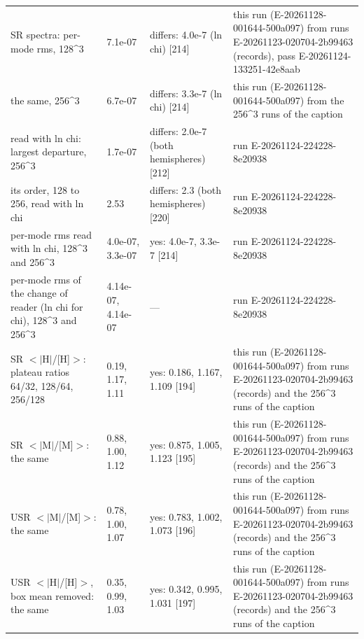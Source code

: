 \begin{table}
\begin{tabular}{p{}p{}p{}p{}}
SR spectra: per-mode rms, 128\^{}3 & 7.1e-07 & differs: 4.0e-7 (ln chi) [214] & this run (E-20261128-001644-500a097) from runs E-20261123-020704-2b99463 (records), pass E-20261124-133251-42e8aab \\
the same, 256\^{}3 & 6.7e-07 & differs: 3.3e-7 (ln chi) [214] & this run (E-20261128-001644-500a097) from the 256\^{}3 runs of the caption \\
read with ln chi: largest departure, 256\^{}3 & 1.7e-07 & differs: 2.0e-7 (both hemispheres) [212] & run E-20261124-224228-8e20938 \\
its order, 128 to 256, read with ln chi & 2.53 & differs: 2.3 (both hemispheres) [220] & run E-20261124-224228-8e20938 \\
per-mode rms read with ln chi, 128\^{}3 and 256\^{}3 & 4.0e-07, 3.3e-07 & yes: 4.0e-7, 3.3e-7 [214] & run E-20261124-224228-8e20938 \\
per-mode rms of the change of reader (ln chi for chi), 128\^{}3 and 256\^{}3 & 4.14e-07, 4.14e-07 & --- & run E-20261124-224228-8e20938 \\
SR $<$$|$H$|$/\allowbreak{}[H]$>$: plateau ratios 64/\allowbreak{}32, 128/\allowbreak{}64, 256/\allowbreak{}128 & 0.19, 1.17, 1.11 & yes: 0.186, 1.167, 1.109 [194] & this run (E-20261128-001644-500a097) from runs E-20261123-020704-2b99463 (records) and the 256\^{}3 runs of the caption \\
SR $<$$|$M$|$/\allowbreak{}[M]$>$: the same & 0.88, 1.00, 1.12 & yes: 0.875, 1.005, 1.123 [195] & this run (E-20261128-001644-500a097) from runs E-20261123-020704-2b99463 (records) and the 256\^{}3 runs of the caption \\
USR $<$$|$M$|$/\allowbreak{}[M]$>$: the same & 0.78, 1.00, 1.07 & yes: 0.783, 1.002, 1.073 [196] & this run (E-20261128-001644-500a097) from runs E-20261123-020704-2b99463 (records) and the 256\^{}3 runs of the caption \\
USR $<$$|$H$|$/\allowbreak{}[H]$>$, box mean removed: the same & 0.35, 0.99, 1.03 & yes: 0.342, 0.995, 1.031 [197] & this run (E-20261128-001644-500a097) from runs E-20261123-020704-2b99463 (records) and the 256\^{}3 runs of the caption \\
\bottomrule
\end{tabular}
\end{table}

